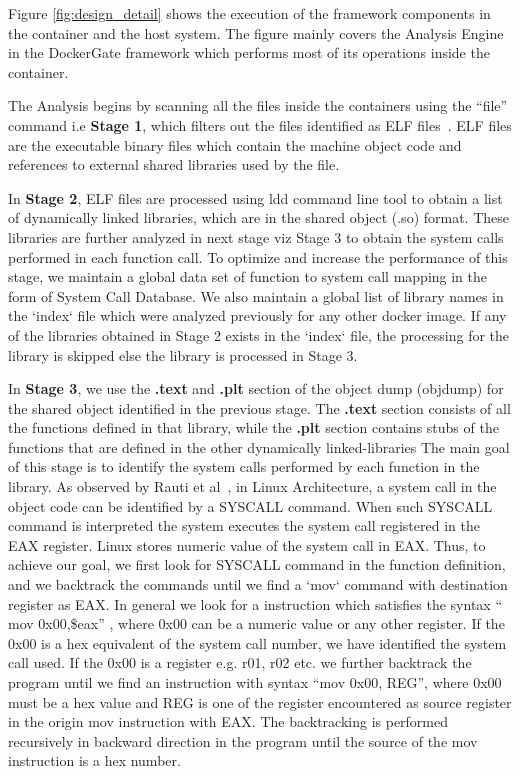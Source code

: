 Figure \ref{fig:design_detail} shows the execution of the framework components in the container and the host system. The figure mainly covers the Analysis Engine in the DockerGate framework which performs most of its operations inside the container. 

The Analysis begins by scanning all the files inside the containers using the “file” command i.e \textbf{Stage 1}, which filters out the files identified as ELF files~\cite{elf}. ELF files are the executable binary files which contain the machine object code and references to external shared libraries used by the file.

In \textbf{Stage 2}, ELF files are processed using ldd command line tool to obtain a list of dynamically linked libraries, which are in the shared object (.so) format. These libraries are further analyzed in next stage viz Stage 3 to obtain the system calls performed in  each function call. To optimize and increase the performance of this stage, we maintain a global data set of function to system call mapping in the form of System Call Database. We also maintain a global list of library names in the `index` file which were analyzed previously for any other docker image. If any of the libraries obtained in Stage 2 exists in the `index` file, the processing for the library is skipped else the library is processed in Stage 3.

In \textbf{Stage 3}, we use the \textbf{.text} and \textbf{.plt} section of the object dump (objdump) for the shared object identified in the previous stage. The \textbf{.text} section consists of all the functions defined in that library, while the \textbf{.plt} section contains stubs of the functions that are defined in the other dynamically linked-libraries The main goal of this stage is to identify the system calls performed by each function in the library. As observed by Rauti et al~\cite{rauti2014diversification}, in Linux Architecture, a system call in the object code can be identified by a SYSCALL command. When such SYSCALL command is interpreted the system executes the system call registered in the EAX register. Linux stores numeric value of the system call in EAX. Thus, to achieve our goal, we first look for SYSCALL command in the function definition, and we backtrack the commands until we find a  `mov` command with destination register as EAX. In general we look for a instruction which satisfies the syntax “ mov 0x00,\$eax” , where 0x00 can be a numeric value or any other register. If the 0x00 is a hex equivalent of the system call number, we have identified the system call used. If the 0x00 is a register e.g. r01, r02 etc. we further backtrack the program until we find an instruction with syntax “mov 0x00, REG”, where 0x00 must be a hex value and REG is one of the register encountered as source register in the origin mov instruction with EAX. The backtracking is performed recursively in backward direction in the program until the source of the mov instruction is a hex number.

